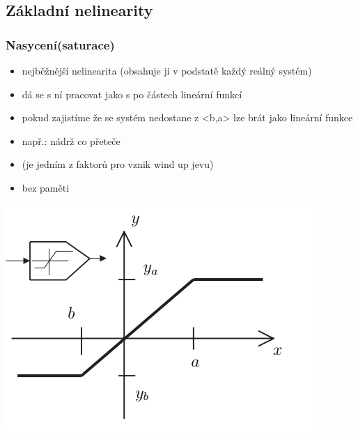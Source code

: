 \subsection*{Základní nelinearity}

\subsubsection*{Nasycení(saturace)}
\begin{itemize}
    \item nejběžnější nelinearita (obsahuje ji v podstatě každý reálný systém)
    \item dá se s ní pracovat jako s po částech lineární funkcí
    \item pokud zajistíme že se systém nedostane z <b,a> lze brát jako lineární funkce
    \item např.: nádrž co přeteče
    \item (je jedním z faktorů pro vznik wind up jevu)
    \item bez paměti
\end{itemize}
\includegraphics[]{img/saturace.png}

